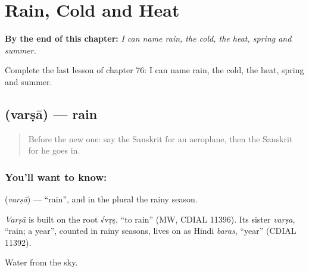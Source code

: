 
\chapter{Rain, Cold and Heat}
\label{ch:sa-rain-cold-heat}

\begin{chapteropening}
\textbf{By the end of this chapter:} \emph{I can name rain, the cold, the heat, spring and summer.}

Complete the last lesson of chapter 76: I can name rain, the cold, the heat, spring and summer.
\end{chapteropening}

\section[\texorpdfstring{\sk{वर्षा} (varṣā)}{वर्षा (varṣā)}]{ (varṣā) — rain}

\label{lesson:SA-C76-rain}



\begin{quote}
Before the new one: say the Sanskrit for an aeroplane, then the Sanskrit for he goes in.
\end{quote}

\subsection*{You'll want to know: }
\textbf{} (\emph{varṣā}) — \textquotedblleft{}rain\textquotedblright{}, and in the plural the rainy season.

\begin{cousinweb}
\emph{Varṣā} is built on the root √vṛṣ, \textquotedblleft{}to rain\textquotedblright{} (MW, CDIAL 11396). Its sister \emph{varṣa}, \textquotedblleft{}rain; a year\textquotedblright{}, counted in rainy seasons, lives on as Hindi \emph{baras}, \textquotedblleft{}year\textquotedblright{} (CDIAL 11392).
\end{cousinweb}

\begin{grammarlens}[title={What you've built}]
Water from the sky.
\end{grammarlens}


